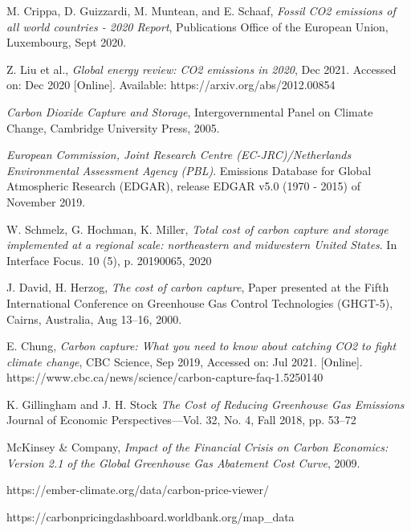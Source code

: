 \documentclass{article}
\begin{document}
\begin{thebibliography}{1}
 M. Crippa, D. Guizzardi, M. Muntean, and E. Schaaf, \textit{Fossil CO2 emissions of all world countries - 2020 Report}, Publications Office of the European Union, Luxembourg, Sept 2020.

 Z. Liu et al.,  \textit{Global energy review: CO2 emissions in 2020}, Dec 2021. Accessed on: Dec 2020 [Online]. Available: https://arxiv.org/abs/2012.00854

 \textit{Carbon Dioxide Capture and Storage}, Intergovernmental Panel on Climate Change, Cambridge University Press, 2005.

 \textit{European Commission, Joint Research Centre (EC-JRC)/Netherlands Environmental Assessment Agency (PBL)}. Emissions Database for Global Atmospheric Research
(EDGAR), release EDGAR v5.0 (1970 - 2015) of November 2019.

 W. Schmelz, G. Hochman, K. Miller, \textit{Total cost of carbon capture and storage implemented at a regional scale: northeastern and midwestern United States}. In Interface Focus. 10 (5), p. 20190065, 2020

 J. David, H. Herzog, \textit{The cost of carbon capture}, Paper presented at the Fifth International Conference on Greenhouse Gas Control Technologies (GHGT-5), Cairns, Australia, Aug 13–16, 2000.

 E. Chung, \textit{Carbon capture: What you need to know about catching CO2 to fight climate change}, CBC Science, Sep 2019, Accessed on: Jul 2021. [Online]. https://www.cbc.ca/news/science/carbon-capture-faq-1.5250140

 K. Gillingham and J. H. Stock \textit{The Cost of Reducing Greenhouse Gas Emissions}
Journal of Economic Perspectives—Vol. 32, No. 4, Fall 2018, pp. 53–72

 McKinsey \& Company, \textit{Impact of the Financial Crisis on Carbon Economics: Version 2.1 of the Global Greenhouse Gas Abatement Cost Curve}, 2009. 

https://ember-climate.org/data/carbon-price-viewer/

https://carbonpricingdashboard.worldbank.org/map_data

\end{thebibliography}
\end{document}
